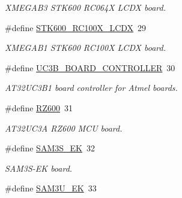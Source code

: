 \begin{DoxyCompactItemize}
\begin{DoxyCompactList}\small\item\em X\+M\+E\+G\+A\+B3 S\+T\+K600 R\+C064\+X L\+C\+D\+X board. \end{DoxyCompactList}\item 
\hypertarget{group__group__common__boards_gab6b4267fd4d74fbb8cf083764addfdc8}{}\#define \hyperlink{group__group__common__boards_gab6b4267fd4d74fbb8cf083764addfdc8}{S\+T\+K600\+\_\+\+R\+C100\+X\+\_\+\+L\+C\+D\+X}~29\label{group__group__common__boards_gab6b4267fd4d74fbb8cf083764addfdc8}

\begin{DoxyCompactList}\small\item\em X\+M\+E\+G\+A\+B1 S\+T\+K600 R\+C100\+X L\+C\+D\+X board. \end{DoxyCompactList}\item 
\hypertarget{group__group__common__boards_ga79a559c8d51d9370af4f37c36b6e7d58}{}\#define \hyperlink{group__group__common__boards_ga79a559c8d51d9370af4f37c36b6e7d58}{U\+C3\+B\+\_\+\+B\+O\+A\+R\+D\+\_\+\+C\+O\+N\+T\+R\+O\+L\+L\+E\+R}~30\label{group__group__common__boards_ga79a559c8d51d9370af4f37c36b6e7d58}

\begin{DoxyCompactList}\small\item\em A\+T32\+U\+C3\+B1 board controller for Atmel boards. \end{DoxyCompactList}\item 
\hypertarget{group__group__common__boards_ga4c22f34cf2ee08f07ce959d9a3009d85}{}\#define \hyperlink{group__group__common__boards_ga4c22f34cf2ee08f07ce959d9a3009d85}{R\+Z600}~31\label{group__group__common__boards_ga4c22f34cf2ee08f07ce959d9a3009d85}

\begin{DoxyCompactList}\small\item\em A\+T32\+U\+C3\+A R\+Z600 M\+C\+U board. \end{DoxyCompactList}\item 
\hypertarget{group__group__common__boards_ga35b2c40ce0679c6c73a010aa2c336a18}{}\#define \hyperlink{group__group__common__boards_ga35b2c40ce0679c6c73a010aa2c336a18}{S\+A\+M3\+S\+\_\+\+E\+K}~32\label{group__group__common__boards_ga35b2c40ce0679c6c73a010aa2c336a18}

\begin{DoxyCompactList}\small\item\em S\+A\+M3\+S-\/\+E\+K board. \end{DoxyCompactList}\item 
\hypertarget{group__group__common__boards_gab5023c1363a78928b59a1c58c9d424b7}{}\#define \hyperlink{group__group__common__boards_gab5023c1363a78928b59a1c58c9d424b7}{S\+A\+M3\+U\+\_\+\+E\+K}~33\label{group__group__common__boards_gab5023c1363a78928b59a1c58c9d424b7}


\end{DoxyCompactItemize}
